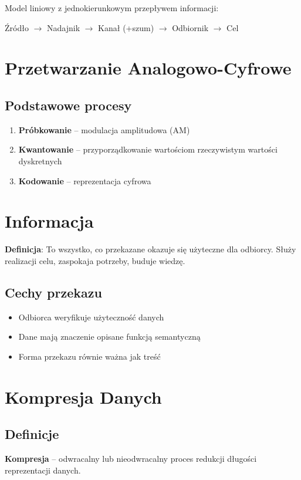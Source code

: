 Model liniowy z jednokierunkowym przepływem informacji:
\begin{center}
Źródło $\rightarrow$ Nadajnik $\rightarrow$ Kanał (+szum) $\rightarrow$ Odbiornik $\rightarrow$ Cel
\end{center}

\section{Przetwarzanie Analogowo-Cyfrowe}

\subsection{Podstawowe procesy}
\begin{enumerate}[noitemsep]
    \item \textbf{Próbkowanie} -- modulacja amplitudowa (AM)
    \item \textbf{Kwantowanie} -- przyporządkowanie wartościom rzeczywistym wartości dyskretnych
    \item \textbf{Kodowanie} -- reprezentacja cyfrowa
\end{enumerate}

\section{Informacja}

\textbf{Definicja}: To wszystko, co przekazane okazuje się użyteczne dla odbiorcy. Służy realizacji celu, zaspokaja potrzeby, buduje wiedzę.

\subsection{Cechy przekazu}
\begin{itemize}[noitemsep]
    \item Odbiorca weryfikuje użyteczność danych
    \item Dane mają znaczenie opisane funkcją semantyczną
    \item Forma przekazu równie ważna jak treść
\end{itemize}

\section{Kompresja Danych}

\subsection{Definicje}
\textbf{Kompresja} -- odwracalny lub nieodwracalny proces redukcji długości reprezentacji danych.

